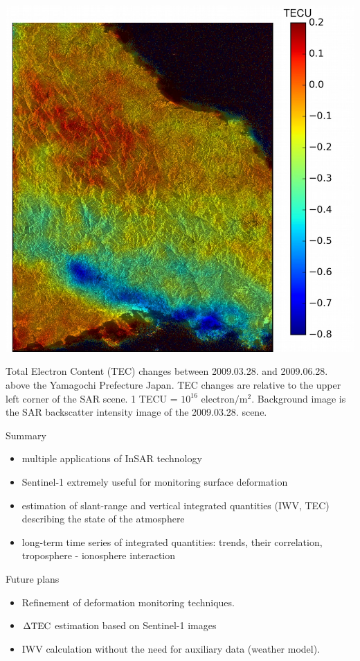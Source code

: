 \documentclass{beamer}
\begin{document}
\begin{frame}{\ft}
    \begin{minipage}[c]{0.7\textwidth}
        \includegraphics[width=1.0\textwidth]{iono.png}
    \end{minipage}
    \begin{minipage}[c]{0.28\textwidth}
         Total Electron Content (TEC) changes between 2009.03.28. and 2009.06.28. above the Yamagochi Prefecture Japan. TEC changes are relative to the upper left corner of the SAR scene. 1 TECU = $10^{16}$ $\mathrm{electron} / \mathrm{m}^2$. Background image is the SAR backscatter intensity image of the 2009.03.28. scene.
    \end{minipage}
\end{frame}


\begin{frame}{Summary}
    \begin{itemize}
        \item multiple applications of InSAR technology
        \item Sentinel-1 extremely useful for monitoring surface deformation
        \item estimation of slant-range and vertical integrated quantities (IWV, TEC) describing the state of the atmosphere
        \item long-term time series of integrated quantities: trends, their correlation, troposphere - ionosphere interaction
    \end{itemize}
    
    {\Large \fcol Future plans}
    \begin{itemize}
        \item Refinement of deformation monitoring techniques.
        \item $\Delta\mathrm{TEC}$ estimation based on Sentinel-1 images
        \item IWV calculation without the need for auxiliary data (weather model).
    \end{itemize}
\end{frame}
\end{document}
